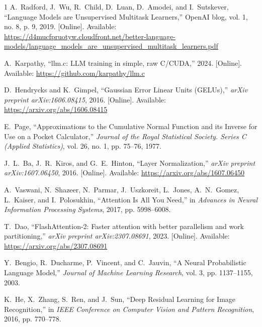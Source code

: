 \documentclass[letterpaper, 10 pt, conference]{ieeeconf}
\theoremstyle{definition}
\begin{document}
\begin{thebibliography}{1}
  A.~Radford, J.~Wu, R.~Child, D.~Luan, D.~Amodei, and I.~Sutskever, ``Language Models are Unsupervised Multitask Learners,'' OpenAI blog, vol. 1, no. 8, p. 9, 2019. [Online]. Available: \url{https://d4mucfpruotyw.cloudfront.net/better-language-models/language_models_are_unsupervised_multitask_learners.pdf}

  A.~Karpathy, ``llm.c: LLM training in simple, raw C/CUDA,'' 2024. [Online]. Available: \url{https://github.com/karpathy/llm.c}

  D.~Hendrycks and K.~Gimpel, ``Gaussian Error Linear Units (GELUs),'' \emph{arXiv preprint arXiv:1606.08415}, 2016. [Online]. Available: \url{https://arxiv.org/abs/1606.08415}

  E.~Page, ``Approximations to the Cumulative Normal Function and its Inverse for Use on a Pocket Calculator,'' \emph{Journal of the Royal Statistical Society. Series C (Applied Statistics)}, vol. 26, no. 1, pp. 75--76, 1977.

  J.~L.~Ba, J.~R.~Kiros, and G.~E.~Hinton, ``Layer Normalization,'' \emph{arXiv preprint arXiv:1607.06450}, 2016. [Online]. Available: \url{https://arxiv.org/abs/1607.06450}

  A.~Vaswani, N.~Shazeer, N.~Parmar, J.~Uszkoreit, L.~Jones, A.~N.~Gomez, L.~Kaiser, and I.~Polosukhin, ``Attention Is All You Need,'' in \emph{Advances in Neural Information Processing Systems}, 2017, pp. 5998--6008.

  T.~Dao, ``FlashAttention-2: Faster attention with better parallelism and work partitioning,'' \emph{arXiv preprint arXiv:2307.08691}, 2023. [Online]. Available: \url{https://arxiv.org/abs/2307.08691}

  Y.~Bengio, R.~Ducharme, P.~Vincent, and C.~Jauvin, ``A Neural Probabilistic Language Model,'' \emph{Journal of Machine Learning Research}, vol. 3, pp. 1137--1155, 2003.

  K.~He, X.~Zhang, S.~Ren, and J.~Sun, ``Deep Residual Learning for Image Recognition,'' in \emph{IEEE Conference on Computer Vision and Pattern Recognition}, 2016, pp. 770--778.
\end{thebibliography}
\end{document}
